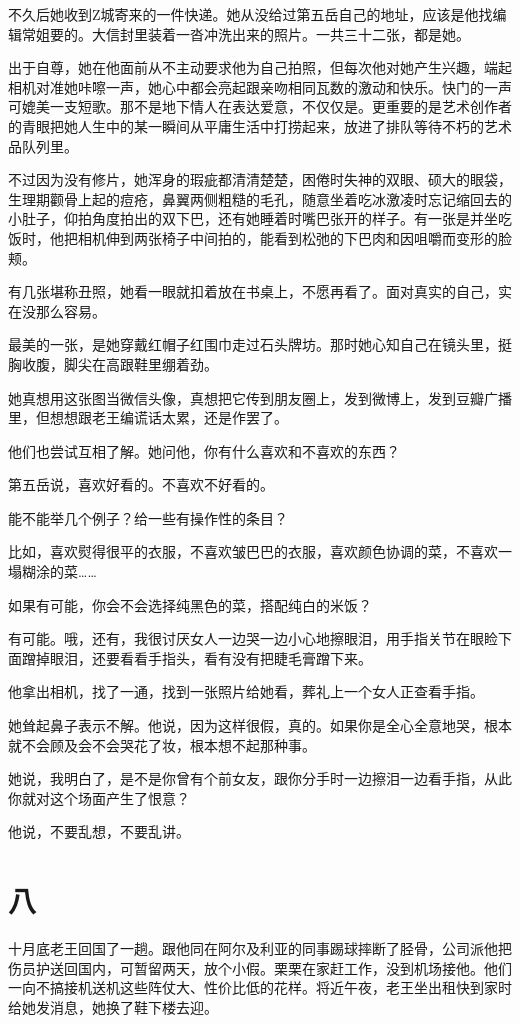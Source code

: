 \documentclass[lang=cn,newtx,12pt,scheme=chinese]{elegantbook}
\begin{document}
不久后她收到Z城寄来的一件快递。她从没给过第五岳自己的地址，应该是他找编辑常姐要的。大信封里装着一沓冲洗出来的照片。一共三十二张，都是她。

出于自尊，她在他面前从不主动要求他为自己拍照，但每次他对她产生兴趣，端起相机对准她咔嚓一声，她心中都会亮起跟亲吻相同瓦数的激动和快乐。快门的一声可媲美一支短歌。那不是地下情人在表达爱意，不仅仅是。更重要的是艺术创作者的青眼把她人生中的某一瞬间从平庸生活中打捞起来，放进了排队等待不朽的艺术品队列里。

不过因为没有修片，她浑身的瑕疵都清清楚楚，困倦时失神的双眼、硕大的眼袋，生理期颧骨上起的痘疮，鼻翼两侧粗糙的毛孔，随意坐着吃冰激凌时忘记缩回去的小肚子，仰拍角度拍出的双下巴，还有她睡着时嘴巴张开的样子。有一张是并坐吃饭时，他把相机伸到两张椅子中间拍的，能看到松弛的下巴肉和因咀嚼而变形的脸颊。

有几张堪称丑照，她看一眼就扣着放在书桌上，不愿再看了。面对真实的自己，实在没那么容易。

最美的一张，是她穿戴红帽子红围巾走过石头牌坊。那时她心知自己在镜头里，挺胸收腹，脚尖在高跟鞋里绷着劲。

她真想用这张图当微信头像，真想把它传到朋友圈上，发到微博上，发到豆瓣广播里，但想想跟老王编谎话太累，还是作罢了。

他们也尝试互相了解。她问他，你有什么喜欢和不喜欢的东西？

第五岳说，喜欢好看的。不喜欢不好看的。

能不能举几个例子？给一些有操作性的条目？

比如，喜欢熨得很平的衣服，不喜欢皱巴巴的衣服，喜欢颜色协调的菜，不喜欢一塌糊涂的菜……

如果有可能，你会不会选择纯黑色的菜，搭配纯白的米饭？

有可能。哦，还有，我很讨厌女人一边哭一边小心地擦眼泪，用手指关节在眼睑下面蹭掉眼泪，还要看看手指头，看有没有把睫毛膏蹭下来。

他拿出相机，找了一通，找到一张照片给她看，葬礼上一个女人正查看手指。

她耸起鼻子表示不解。他说，因为这样很假，真的。如果你是全心全意地哭，根本就不会顾及会不会哭花了妆，根本想不起那种事。

她说，我明白了，是不是你曾有个前女友，跟你分手时一边擦泪一边看手指，从此你就对这个场面产生了恨意？

他说，不要乱想，不要乱讲。
\section{八}
十月底老王回国了一趟。跟他同在阿尔及利亚的同事踢球摔断了胫骨，公司派他把伤员护送回国内，可暂留两天，放个小假。栗栗在家赶工作，没到机场接他。他们一向不搞接机送机这些阵仗大、性价比低的花样。将近午夜，老王坐出租快到家时给她发消息，她换了鞋下楼去迎。
\end{document}
